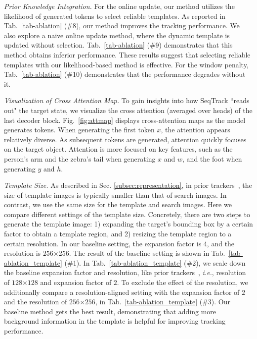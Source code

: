 \textit{Prior Knowledge Integration.} 
For the online update, our method utilizes the likelihood of generated tokens to select reliable templates.
As reported in Tab.~\ref{tab-ablation} (\#8), our method improves the tracking performance.
We also explore a naive online update method, where the dynamic template is updated without selection.
Tab.~\ref{tab-ablation} (\#9) demonstrates that this method obtains inferior performance. These results suggest that selecting reliable templates with our likelihood-based method is effective. 
For the window penalty, Tab.~\ref{tab-ablation} (\#10) demonstrates that the performance degrades without it.

\textit{Visualization of Cross Attention Map.}
To gain insights into how SeqTrack ``reads out" the target state, we visualize the cross attention (averaged over heads) of the last decoder block.
Fig.~\ref{fig:attmap} displays cross-attention maps as the model generates tokens. When generating the first token $x$, the attention appears relatively diverse.
As subsequent tokens are generated, attention quickly focuses on the target object.
Attention is more focused on key features, such as the person's arm and the zebra's tail when generating $x$ and $w$, and the foot when generating $y$ and $h$.

\textit{Template Size.}
As described in Sec. \ref{subsec:representation}, in prior trackers~\cite{SiameseFC,SiameseRPN,transt,Stark}, the size of template images is typically smaller than that of search images. In contrast, we use the same size for the template and search images. 
Here we compare different settings of the template size. 
Concretely, there are two steps to generate the template image: 1) expanding the target's bounding box by a certain factor to obtain a template region, and 2) resizing the template region to a certain resolution.
In our baseline setting, the expansion factor is $4$, and the resolution is $256$$\times$$256$.
The result of the baseline setting is shown in Tab.~\ref{tab-ablation_template} (\#1).
In Tab.~\ref{tab-ablation_template} (\#2), we scale down the baseline expansion factor and resolution, like prior trackers~\cite{SiameseFC,transt}, \emph{i.e.}, resolution of $128$$\times$$128$ and expansion factor of $2$. To exclude the effect of the resolution, we additionally compare a resolution-aligned setting with the expansion factor of $2$ and the resolution of $256$$\times$$256$, in Tab.~\ref{tab-ablation_template} (\#3).
Our baseline method gets the best result, demonstrating that adding more background information in the template is helpful for improving tracking performance.

